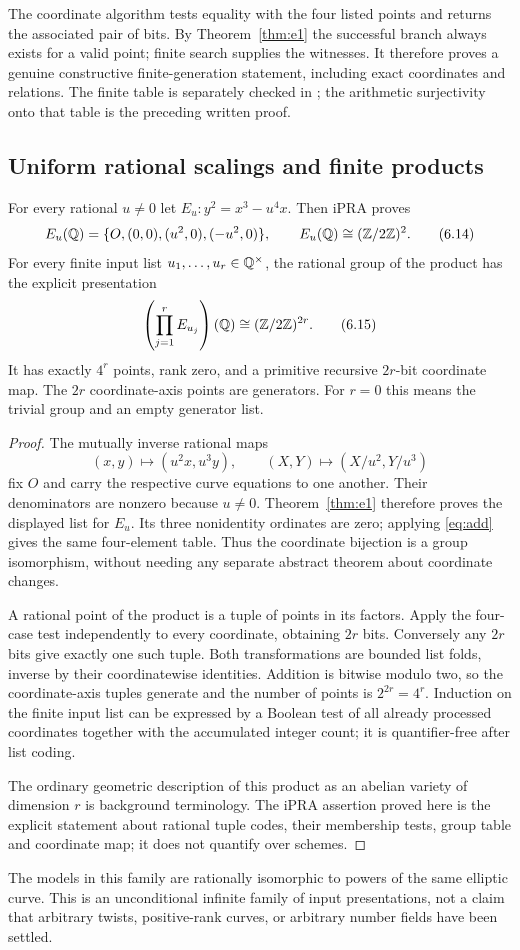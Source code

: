 The coordinate algorithm tests equality with the four listed points
and returns the associated pair of bits. By Theorem~\ref{thm:e1} the
successful branch always exists for a valid point; finite search supplies
the witnesses. It therefore proves a genuine constructive finite-generation
statement, including exact coordinates and relations. The finite table
is separately checked in ; the arithmetic
surjectivity onto that table is the preceding written proof.

\subsection{Uniform rational scalings and finite products}

\begin{theorem}
\label{thm:products}
For every rational $u\ne0$ let $E_u:y^2=x^3-u^4x$. Then iPRA proves
\[
 E_u(\mathbb Q)=\{O,(0,0),(u^2,0),(-u^2,0)\},
 \qquad E_u(\mathbb Q)\cong(\mathbb Z/2\mathbb Z)^2.
 \tag{6.14}
\]
For every finite input list $u_1,\ldots,u_r\in\mathbb Q^\times$, the rational
group of the product has the explicit presentation
\[
 \left(\prod_{j=1}^rE_{u_j}\right)(\mathbb Q)
       \cong(\mathbb Z/2\mathbb Z)^{2r}.
 \tag{6.15}
\]
It has exactly $4^r$ points, rank zero, and a primitive recursive
$2r$-bit coordinate map. The $2r$ coordinate-axis points are generators.
For $r=0$ this means the trivial group and an empty generator list.
\end{theorem}
\begin{proof}
The mutually inverse rational maps
\[
 (x,y)\longmapsto(u^2x,u^3y),\qquad
 (X,Y)\longmapsto(X/u^2,Y/u^3)
 \tag{6.16}
\]
fix $O$ and carry the respective curve equations to one another.
Their denominators are nonzero because $u\ne0$.
Theorem~\ref{thm:e1} therefore proves the displayed list for $E_u$.
Its three nonidentity ordinates are zero; applying
\eqref{eq:add} gives the same four-element table. Thus the
coordinate bijection is a group isomorphism, without needing any
separate abstract theorem about coordinate changes.

A rational point of the product is a tuple of points in its factors.
Apply the four-case test independently to every coordinate, obtaining
$2r$ bits. Conversely any $2r$ bits give exactly one such tuple.
Both transformations are bounded list folds, inverse by their
coordinatewise identities. Addition is bitwise modulo two, so the
coordinate-axis tuples generate and the number of points is $2^{2r}=4^r$.
Induction on the finite input list can be expressed by a Boolean test
of all already processed coordinates together with the accumulated
integer count; it is quantifier-free after list coding.

The ordinary geometric description of this product as an abelian variety
of dimension $r$ is background terminology. The iPRA assertion proved
here is the explicit statement about rational tuple codes, their
membership tests, group table and coordinate map; it does not quantify
over schemes.
\end{proof}

The models in this family are rationally isomorphic to powers of the same
elliptic curve. This is an unconditional infinite family of input
presentations, not a claim that arbitrary twists, positive-rank curves,
or arbitrary number fields have been settled.
